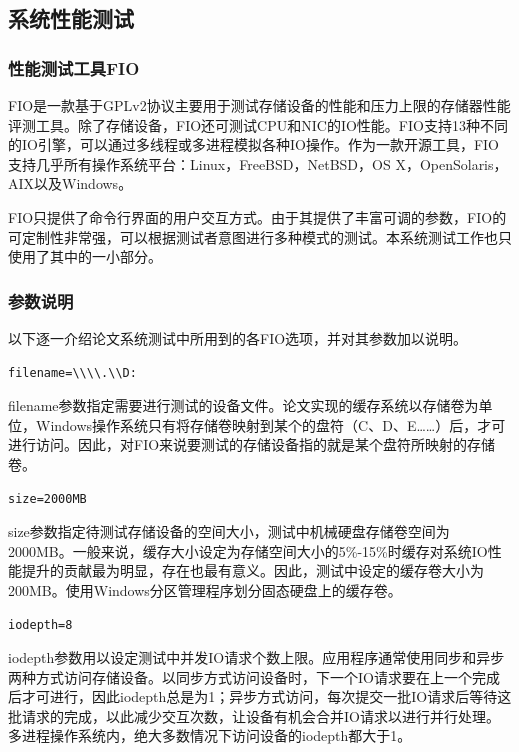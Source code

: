 \subsection{系统性能测试}

\subsubsection{性能测试工具FIO}
FIO是一款基于GPLv2协议主要用于测试存储设备的性能和压力上限的存储器性能评测工具。除了存储设备，FIO还可测试CPU和NIC的IO性能。FIO支持13种不同的IO引擎，可以通过多线程或多进程模拟各种IO操作。作为一款开源工具，FIO支持几乎所有操作系统平台：Linux，FreeBSD，NetBSD，OS X，OpenSolaris，AIX以及Windows。

FIO只提供了命令行界面的用户交互方式。由于其提供了丰富可调的参数，FIO的可定制性非常强，可以根据测试者意图进行多种模式的测试。本系统测试工作也只使用了其中的一小部分。

\subsubsection{参数说明}

以下逐一介绍论文系统测试中所用到的各FIO选项，并对其参数加以说明。

\begin{lstlisting}
filename=\\\\.\\D:
\end{lstlisting}

filename参数指定需要进行测试的设备文件。论文实现的缓存系统以存储卷为单位，Windows操作系统只有将存储卷映射到某个的盘符（C、D、E……）后，才可进行访问。因此，对FIO来说要测试的存储设备指的就是某个盘符所映射的存储卷。

\begin{lstlisting}
size=2000MB
\end{lstlisting}

size参数指定待测试存储设备的空间大小，测试中机械硬盘存储卷空间为2000MB。一般来说，缓存大小设定为存储空间大小的5\%-15\%时缓存对系统IO性能提升的贡献最为明显，存在也最有意义。因此，测试中设定的缓存卷大小为200MB。使用Windows分区管理程序划分固态硬盘上的缓存卷。

\begin{lstlisting}
iodepth=8
\end{lstlisting}

iodepth参数用以设定测试中并发IO请求个数上限。应用程序通常使用同步和异步两种方式访问存储设备。以同步方式访问设备时，下一个IO请求要在上一个完成后才可进行，因此iodepth总是为1；异步方式访问，每次提交一批IO请求后等待这批请求的完成，以此减少交互次数，让设备有机会合并IO请求以进行并行处理。多进程操作系统内，绝大多数情况下访问设备的iodepth都大于1。

